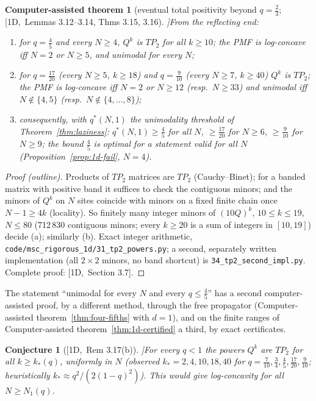 \documentclass[10pt,a4paper]{article}
\theoremstyle{plain}
\newtheorem{catheorem}[theorem]{Computer-assisted theorem}
\newtheorem{conjecture}[theorem]{Conjecture}
\theoremstyle{definition}
\newcommand{\src}[2]{[\textsf{#1},~#2]}           %
\newcommand{\ONE}{\textsf{1D}}
\begin{document}
\begin{catheorem}[eventual total positivity beyond $q=\frac23$; \src{\ONE}{Lemmas 3.12--3.14, Thms 3.15, 3.16}]\label{thm:1d-tp2}
From the reflecting end:
\begin{enumerate}[label=(\alph*)]
\item for $q=\frac45$ and every $N\ge4$, $Q^k$ is $TP_2$ for all $k\ge10$; the PMF is log-concave iff $N=2$ or $N\ge5$, and unimodal for every $N$;
\item for $q=\frac{17}{20}$ (every $N\ge5$, $k\ge18$) and $q=\frac9{10}$ (every $N\ge7$, $k\ge40$) $Q^k$ is $TP_2$; the PMF is log-concave iff $N=2$ or $N\ge12$ (resp.\ $N\ge33$) and unimodal iff $N\notin\{4,5\}$ (resp.\ $N\notin\{4,\dots,8\}$);
\item consequently, with $q^*(N,1)$ the unimodality threshold of Theorem~\ref{thm:laziness}: $q^*(N,1)\ge\frac45$ for all $N$, $\ge\frac{17}{20}$ for $N\ge6$, $\ge\frac9{10}$ for $N\ge9$; the bound $\frac45$ is optimal for a statement valid for all $N$ (Proposition~\ref{prop:1d-fail}, $N=4$).
\end{enumerate}
\end{catheorem}
\begin{proof}[Proof (outline)]
Products of $TP_2$ matrices are $TP_2$ (Cauchy--Binet); for a banded matrix with positive band it suffices to check the contiguous minors; and the minors of $Q^k$ on $N$ sites coincide with minors on a fixed finite chain once $N-1\ge4k$ (locality). So finitely many integer minors of $(10Q)^k$, $10\le k\le19$, $N\le80$ (712\,830 contiguous minors; every $k\ge20$ is a sum of integers in $[10,19]$) decide (a); similarly (b). Exact integer arithmetic, \texttt{code/msc\_rigorous\_1d/31\_tp2\_powers.py}; a second, separately written implementation (all $2\times2$ minors, no band shortcut) is \texttt{34\_tp2\_second\_impl.py}. Complete proof: \src{\ONE}{Section 3.7}.
\end{proof}
The statement ``unimodal for every $N$ and every $q\le\frac45$'' has a second computer-assisted proof, by a different method, through the free propagator (Computer-assisted theorem~\ref{thm:four-fifths} with $d=1$), and on the finite ranges of Computer-assisted theorem~\ref{thm:1d-certified} a third, by exact certificates.

\begin{conjecture}[\src{\ONE}{Rem 3.17(b)}]\label{conj:eventualtp2}
For every $q<1$ the powers $Q^k$ are $TP_2$ for all $k\ge k_*(q)$, uniformly in $N$ (observed $k_*=2,4,10,18,40$ for $q=\frac7{10},\frac34,\frac45,\frac{17}{20},\frac9{10}$; heuristically $k_*\approx q^2/(2(1-q)^2)$). This would give log-concavity for all $N\ge N_1(q)$.
\end{conjecture}
\end{document}
